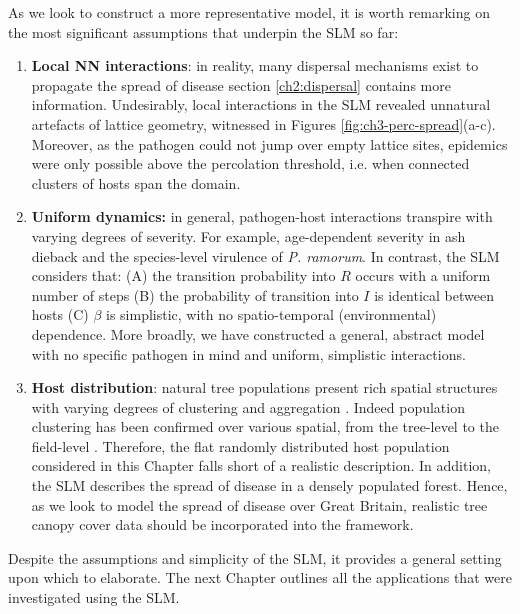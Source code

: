 As we look to construct a more representative model, it is worth remarking on the most significant assumptions that underpin the SLM so far:
\begin{enumerate}
    \item \textbf{Local NN interactions}: in reality, many dispersal mechanisms exist to propagate the spread of disease\textemdash 
    section \ref{ch2:dispersal} contains more information. 
    Undesirably, local interactions in the SLM revealed unnatural artefacts of lattice geometry, witnessed in Figures \ref{fig:ch3-perc-spread}(a-c).
    Moreover, as the pathogen could not jump over empty lattice sites, epidemics were only possible above the percolation threshold, 
    i.e. when connected clusters of hosts span the domain.  
    
    \item \textbf{Uniform dynamics:} in general, pathogen-host interactions transpire with varying degrees of severity.
    For example, age-dependent severity in ash dieback and the species-level virulence of \textit{P. ramorum}. 
    In contrast, the SLM considers that: (A) the transition probability into $R$ occurs with a uniform number of steps 
    (B) the probability of transition into $I$ is identical between hosts 
    (C) $\beta$ is simplistic, with no spatio-temporal (environmental) dependence. 
    More broadly, we have constructed a general, abstract model with no specific pathogen in mind and uniform, simplistic interactions.
    
    \item \textbf{Host distribution}: natural tree populations present rich spatial structures with varying degrees of clustering and aggregation \cite{doi:10.1086/342823}.
    Indeed population clustering has been confirmed over various spatial, from the tree-level to the field-level \cite{wiegand2007analyzing}.
    Therefore, the flat randomly distributed host population considered in this Chapter falls short of a realistic description.
    In addition, the SLM describes the spread of disease in a densely populated forest.
    Hence, as we look to model the spread of disease over Great Britain, realistic tree canopy cover data should be incorporated into the framework.
\end{enumerate}
Despite the assumptions and simplicity of the SLM, it provides a general setting upon which to elaborate.
The next Chapter outlines all the applications that were investigated using the SLM.
\newpage